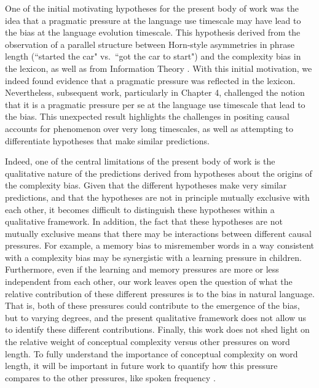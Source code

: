 One of the initial motivating hypotheses for the present body of work was the idea that a pragmatic pressure at the language use timescale  may have lead to the bias at the language evolution timescale. This hypothesis derived from the observation of a parallel structure between Horn-style asymmetries in phrase length (``started the car" vs.\ ``got the car to start") and the complexity bias in the lexicon, as well as from Information Theory \cite{horn1984,shannon1948}. With this initial motivation, we indeed found evidence that a pragmatic pressure was reflected in the lexicon. Nevertheless, subsequent work, particularly in Chapter 4, challenged the notion that it is a pragmatic pressure  per se at the language use timescale that lead to the bias. This unexpected result highlights the challenges in positing causal accounts for phenomenon over very long timescales, as well as attempting to differentiate hypotheses that make  similar predictions.

Indeed, one of the central limitations of the present body of work is the qualitative nature of the predictions derived from  hypotheses about the origins of the complexity bias. Given that the different hypotheses make very similar predictions, and that the hypotheses are not in principle mutually exclusive with each other, it becomes difficult to distinguish these hypotheses within a qualitative framework. In addition, the fact that these hypotheses are not mutually exclusive means that there may be interactions between different causal pressures. For example, a memory bias to misremember words in a way consistent with a complexity bias may be synergistic with a learning pressure in children. Furthermore, even if the learning and memory pressures are more or less independent from each other, our work leaves open the question of what the relative contribution of these different pressures is to the bias in natural language. That is, both of these pressures could contribute to the emergence of the bias, but to varying degrees, and the present qualitative framework does not allow us to identify these different contributions. Finally, this work does not shed light on the relative weight of conceptual complexity versus other pressures on word length. To fully understand the importance of conceptual complexity on word length, it will be important in future work to quantify how this pressure compares to the other pressures, like spoken frequency \cite{zipf1936}.

